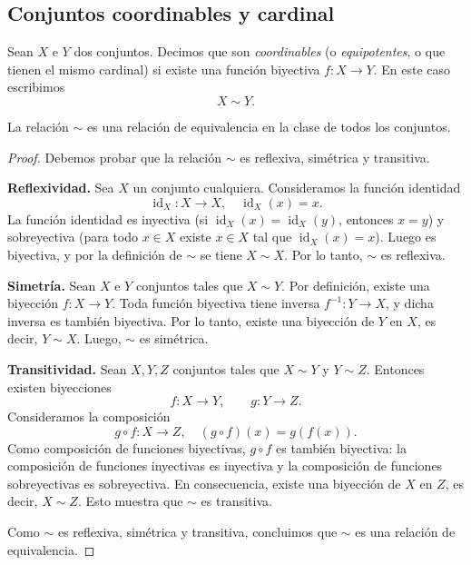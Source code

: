 \subsection{Conjuntos coordinables y cardinal}

\begin{defi}
Sean $X$ e $Y$ dos conjuntos. Decimos que son \emph{coordinables}
(o \emph{equipotentes}, o que tienen el mismo cardinal) si existe
una función biyectiva $f : X \to Y$. En este caso escribimos
\[
X \sim Y.
\]
\end{defi}

\begin{prop}
La relación $\sim$ es una relación de equivalencia en la clase de
todos los conjuntos.
\end{prop}

\begin{proof}
Debemos probar que la relación $\sim$ es reflexiva, simétrica
y transitiva.

\medskip

\noindent\textbf{Reflexividad.}
Sea $X$ un conjunto cualquiera. Consideramos la función identidad
\[
\operatorname{id}_X : X \to X, \quad \operatorname{id}_X(x) = x.
\]
La función identidad es inyectiva (si $\operatorname{id}_X(x)
= \operatorname{id}_X(y)$, entonces $x = y$) y sobreyectiva
(para todo $x \in X$ existe $x \in X$ tal que
$\operatorname{id}_X(x) = x$). Luego es biyectiva, y por la
definición de $\sim$ se tiene $X \sim X$. Por lo tanto, $\sim$
es reflexiva.

\medskip

\noindent\textbf{Simetría.}
Sean $X$ e $Y$ conjuntos tales que $X \sim Y$. Por definición,
existe una biyección $f : X \to Y$. Toda función biyectiva tiene
inversa $f^{-1} : Y \to X$, y dicha inversa es también biyectiva.
Por lo tanto, existe una biyección de $Y$ en $X$, es decir,
$Y \sim X$. Luego, $\sim$ es simétrica.

\medskip

\noindent\textbf{Transitividad.}
Sean $X, Y, Z$ conjuntos tales que $X \sim Y$ y $Y \sim Z$.
Entonces existen biyecciones
\[
f : X \to Y,
\qquad
g : Y \to Z.
\]
Consideramos la composición
\[
g \circ f : X \to Z, \quad (g \circ f)(x) = g(f(x)).
\]
Como composición de funciones biyectivas, $g \circ f$ es también
biyectiva: la composición de funciones inyectivas es inyectiva y
la composición de funciones sobreyectivas es sobreyectiva. En
consecuencia, existe una biyección de $X$ en $Z$, es decir,
$X \sim Z$. Esto muestra que $\sim$ es transitiva.

\medskip

Como $\sim$ es reflexiva, simétrica y transitiva, concluimos que
$\sim$ es una relación de equivalencia.
\end{proof}

